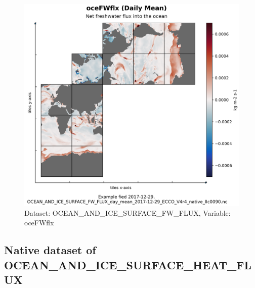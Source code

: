 \begin{figure}[H]
\centering
\includegraphics[scale=0.55]{../images/plots/native_plots/Ocean_and_Sea-Ice_Surface_Freshwater_Fluxes/oceFWflx.png}
\caption{Dataset: OCEAN\_AND\_ICE\_SURFACE\_FW\_FLUX, Variable: oceFWflx}
\label{tab:table-OCEAN_AND_ICE_SURFACE_FW_FLUX_oceFWflx-Plot}
\end{figure}
\subsection{Native dataset of OCEAN\_AND\_ICE\_SURFACE\_HEAT\_FLUX}
\newp
